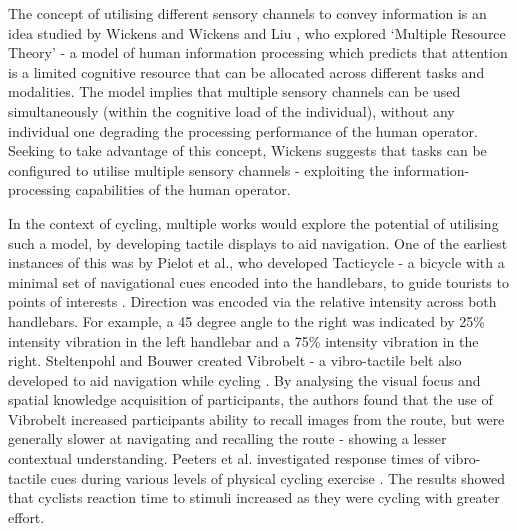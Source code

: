 \documentclass{interim}
\begin{document}
The concept of utilising different sensory channels to convey information is an idea studied by Wickens \cite{wickens1984processing} and Wickens and Liu \cite{doi:10.1177/001872088803000505}, who explored ‘Multiple Resource Theory’ - a model of human information processing which predicts that attention is a limited cognitive resource that can be allocated across different tasks and modalities. The model implies that multiple sensory channels can be used simultaneously (within the cognitive load of the individual), without any individual one degrading the processing performance of the human operator. Seeking to take advantage of this concept, Wickens suggests that tasks can be configured to utilise multiple sensory channels - exploiting the information-processing capabilities of the human operator.

In the context of cycling, multiple works would explore the potential of utilising such a model, by developing tactile displays to aid navigation. One of the earliest instances of this was by Pielot et al., who developed Tacticycle - a bicycle with a minimal set of navigational cues encoded into the handlebars, to guide tourists to points of interests \cite{10.1145/2371574.2371631}. Direction was encoded via the relative intensity across both handlebars. For example, a 45 degree angle to the right was indicated by 25\% intensity vibration in the left handlebar and a 75\% intensity vibration in the right. Steltenpohl and Bouwer created Vibrobelt - a vibro-tactile belt also developed to aid navigation while cycling \cite{10.1145/2449396.2449450}. By analysing the visual focus and spatial knowledge acquisition of participants, the authors found that the use of Vibrobelt increased participants ability to recall images from the route, but were generally slower at navigating and recalling the route - showing a lesser contextual understanding. Peeters et al. investigated response times of vibro-tactile cues during various levels of physical cycling exercise \cite{peeters2019vibrotactile}. The results showed that cyclists reaction time to stimuli increased as they were cycling with greater effort.
\end{document}
